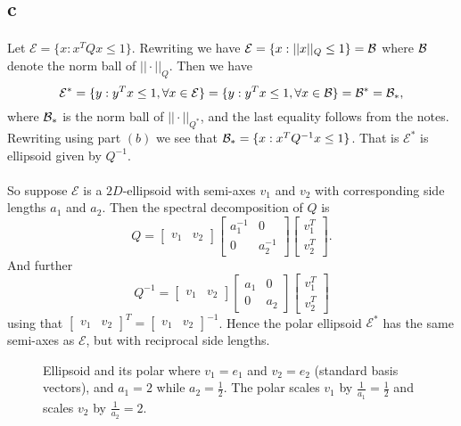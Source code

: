 \documentclass[letterpaper,12pt,oneside,onecolumn]{article}
\newcommand{\cE}{\mathcal{E}} \newcommand{\cF}{\mathcal{F}}
\begin{document}
\subsection{c}
\paragraph{}
Let $\cE = \{x : x^TQx \leq 1\}.$  Rewriting we have $\cE = \{x : ||x||_Q \leq 1\} = \cB$ where $\mathcal{B}$ denote the norm ball of $||\cdot||_Q$. Then we have
$$\cE^* = \{y : y^Tx \leq 1, \forall x \in \cE\} = \{y : y^Tx \leq 1, \forall x \in \cB\}  = \cB^* = \cB_*,$$
where $\mathcal{B}_*$ is the norm ball of $||\cdot||_{Q^*}$, and the last equality follows from the notes. Rewriting using part $(b)$ we see that $\mathcal{B}_* = \{x: x^TQ^{-1}x \leq 1\}$. That is $\cE^*$ is ellipsoid given by $Q^{-1}$.
\paragraph{}
So suppose $\cE$ is a $2D$-ellipsoid with semi-axes $v_1$ and $v_2$ with corresponding side lengths $a_1$ and $a_2$. Then the spectral decomposition of $Q$ is
$$Q = \begin{bmatrix} v_1 & v_2 \end{bmatrix} \begin{bmatrix} a_1^{-1} & 0 \\ 0 & a_2^{-1} \end{bmatrix} \begin{bmatrix} v_1^T \\v_2^T\end{bmatrix}.$$
And further
$$Q^{-1} =  \begin{bmatrix} v_1 & v_2 \end{bmatrix} \begin{bmatrix} a_1 & 0 \\ 0 & a_2 \end{bmatrix} \begin{bmatrix} v_1^T \\v_2^T\end{bmatrix}$$
using that $ \begin{bmatrix} v_1 & v_2 \end{bmatrix}^T =  \begin{bmatrix} v_1 & v_2 \end{bmatrix}^{-1}$. Hence the polar ellipsoid $\cE^*$ has the same semi-axes as $\cE$, but with reciprocal side lengths.
\begin{figure}[H]
\centering
{}
\caption{Ellipsoid and its polar where $v_1 = e_1$ and $v_2 = e_2$ (standard basis vectors), and $a_1 = 2$ while $a_2 = \frac{1}{2}$. The polar scales $v_1$ by $\frac{1}{a_1} = \frac{1}{2}$ and scales $v_2$ by $\frac{1}{a_2} = 2$.}
\end{figure}
\end{document}
